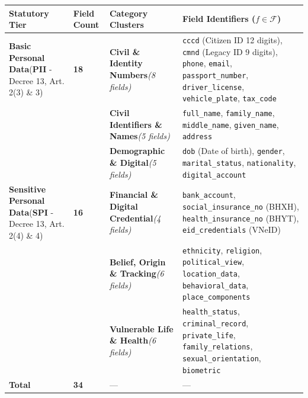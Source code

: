 \documentclass[
]{article}
\newcounter{none} %
\begin{document}
{\def\LTcaptype{none} %
\begin{longtable}[]{@{}
  >{\raggedright\arraybackslash}p{}
  >{\centering\arraybackslash}p{}
  >{\raggedright\arraybackslash}p{}
  >{\raggedright\arraybackslash}p{}@{}}
\toprule\noalign{}
\begin{minipage}[b]{\linewidth}\raggedright
Statutory Tier
\end{minipage} & \begin{minipage}[b]{\linewidth}\centering
Field Count
\end{minipage} & \begin{minipage}[b]{\linewidth}\raggedright
Category Clusters
\end{minipage} & \begin{minipage}[b]{\linewidth}\raggedright
Field Identifiers (\(f \in \mathcal{F}\))
\end{minipage} \\
\midrule\noalign{}
\endhead
\bottomrule\noalign{}
\endlastfoot
\textbf{Basic Personal Data}(\textbf{PII} - Decree 13, Art. 2(3) \& 3) &
\textbf{18} & \textbf{Civil \& Identity Numbers}\emph{(8 fields)} &
\texttt{cccd} (Citizen ID 12 digits), \texttt{cmnd} (Legacy ID 9
digits), \texttt{phone}, \texttt{email}, \texttt{passport\_number},
\texttt{driver\_license}, \texttt{vehicle\_plate}, \texttt{tax\_code} \\
& & \textbf{Civil Identifiers \& Names}\emph{(5 fields)} &
\texttt{full\_name}, \texttt{family\_name}, \texttt{middle\_name},
\texttt{given\_name}, \texttt{address} \\
& & \textbf{Demographic \& Digital}\emph{(5 fields)} & \texttt{dob}
(Date of birth), \texttt{gender}, \texttt{marital\_status},
\texttt{nationality}, \texttt{digital\_account} \\
\textbf{Sensitive Personal Data}(\textbf{SPI} - Decree 13, Art. 2(4) \&
4) & \textbf{16} & \textbf{Financial \& Digital Credential}\emph{(4
fields)} & \texttt{bank\_account}, \texttt{social\_insurance\_no}
(BHXH), \texttt{health\_insurance\_no} (BHYT), \texttt{eid\_credentials}
(VNeID) \\
& & \textbf{Belief, Origin \& Tracking}\emph{(6 fields)} &
\texttt{ethnicity}, \texttt{religion}, \texttt{political\_view},
\texttt{location\_data}, \texttt{behavioral\_data},
\texttt{place\_components} \\
& & \textbf{Vulnerable Life \& Health}\emph{(6 fields)} &
\texttt{health\_status}, \texttt{criminal\_record},
\texttt{private\_life}, \texttt{family\_relations},
\texttt{sexual\_orientation}, \texttt{biometric} \\
\textbf{Total} & \textbf{34} & --- & --- \\
\end{longtable}
}
\end{document}
